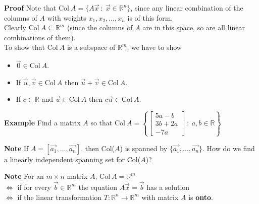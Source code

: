  \begin{frame}[fragile]
\textbf{Proof}
Note that $ \mbox{Col} \ A = \{ A \vec{x} \ : \ \vec{x} \in \mathbb R^n \}$, since any linear combination of the columns of $A$ 
with weights $x_1, x_2, \dots , x_n$ is of this form.  \\ 
Clearly $\mbox{Col} \ A \subseteq \mathbb R^m$ (since the columns of $A$ are in this space, 
so are all linear combinations of them).  \\ 

To show that $\mbox{Col} \ A$ is a subspace of $\mathbb R^m$, we have to show
\begin{itemize}
\item $\vec{0} \in \mbox{Col} \ A$.
\item If $\vec{u}, \vec{v} \in \mbox{Col} \ A$ then 
$\vec{u} + \vec{v} \in \mbox{Col} \ A$.
\item If $c \in \mathbb R$ and $\vec{u} \in \mbox{Col} \ A$ then 
$c\vec{u} \in \mbox{Col} \ A$.
\end{itemize}

\end{frame}






 \begin{frame}[fragile]
\textbf{Example}
Find a matrix $A$ so that 
$\mbox{Col} \ A = \left\{ \left[\begin{array}{c} 5a-b \\ 3b + 2a \\ -7a \end{array}\right] \ : \ a ,b \in \mathbb R\right\}$



\textbf{Note}
If $A=[\vec{a_1}, \dots, \vec{a_n}]$, then Col($A$) is spanned by $\{\vec{a_1}, \dots, \vec{a_n}\}$.  How do we find a linearly independent spanning set for Col($A$)?



\textbf{Note}
For an $m \times n$ matrix $A$, $\mbox{Col} \ A =\mathbb R^m$ \\
$\iff$ if for every $\vec{b} \in \mathbb R^m$ the equation 
$A \vec{x} = \vec{b}$ has a solution\\
$\iff$ if the linear transformation  $T : \mathbb R^n \longrightarrow \mathbb R^m$ with 
matrix $A$ is \textbf{onto}.


\end{frame}









